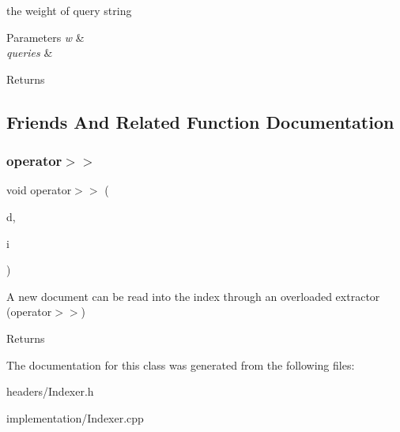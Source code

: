 the weight of query string 
\begin{DoxyParams}{Parameters}
{\em w} & \\
\hline
{\em queries} & \\
\hline
\end{DoxyParams}
\begin{DoxyReturn}{Returns}

\end{DoxyReturn}


\subsection{Friends And Related Function Documentation}
\mbox{\label{classIndexer_a3169c2dd098e8a2c7f5c4bb628766720}} 
\subsubsection{\texorpdfstring{operator$>$$>$}{operator>>}}
{\footnotesize\ttfamily void operator$>$$>$ (\begin{DoxyParamCaption}\item[{const \hyperlink{classIndexItem}{Index\+Item} \&}]{d,  }\item[{\hyperlink{classIndexer}{Indexer} \&}]{i }\end{DoxyParamCaption})\hspace{0.3cm}{\ttfamily [friend]}}

A new document can be read into the index through an overloaded extractor (operator$>$$>$) \begin{DoxyReturn}{Returns}

\end{DoxyReturn}


The documentation for this class was generated from the following files\+:\begin{DoxyCompactItemize}
\item 
headers/Indexer.\+h\item 
implementation/Indexer.\+cpp\end{DoxyCompactItemize}
